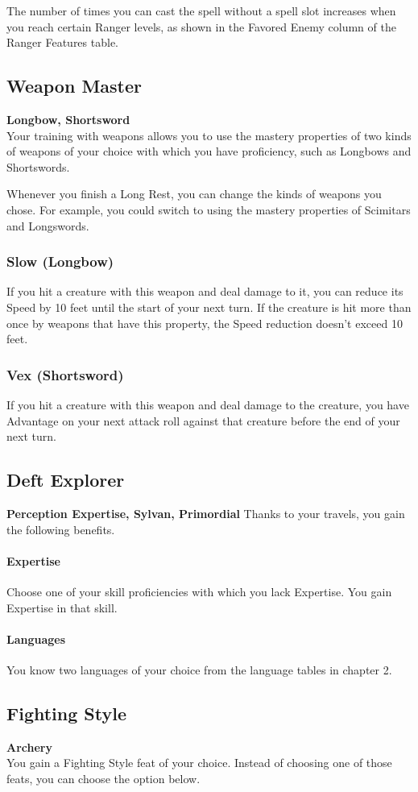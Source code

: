 \documentclass[letterpaper,openany,oneside,twocolumn]{book}
\begin{document}
The number of times you can cast the spell without a spell slot increases when you reach certain Ranger levels, as shown in the Favored Enemy column of the Ranger Features table.
\subsection*{Weapon Master}
\textbf{Longbow, Shortsword}\\
Your training with weapons allows you to use the mastery properties of two kinds of weapons of your choice with which you have proficiency, such as Longbows and Shortswords.

Whenever you finish a Long Rest, you can change the kinds of weapons you chose. For example, you could switch to using the mastery properties of Scimitars and Longswords.
\subsubsection*{Slow (Longbow)}
If you hit a creature with this weapon and deal damage to it, you can reduce its Speed by 10 feet until the start of your next turn. If the creature is hit more than once by weapons that have this property, the Speed reduction doesn't exceed 10 feet.
\subsubsection*{Vex (Shortsword)}
If you hit a creature with this weapon and deal damage to the creature, you have Advantage on your next attack roll against that creature before the end of your next turn.
\subsection*{Deft Explorer}
\textbf{Perception Expertise, Sylvan, Primordial}
Thanks to your travels, you gain the following benefits.

\paragraph*{Expertise} Choose one of your skill proficiencies with which you lack Expertise. You gain Expertise in that skill.

\paragraph*{Languages} You know two languages of your choice from the language tables in chapter 2.
\subsection*{Fighting Style}
\textbf{Archery}\\
You gain a Fighting Style feat of your choice. Instead of choosing one of those feats, you can choose the option below.
\end{document}
